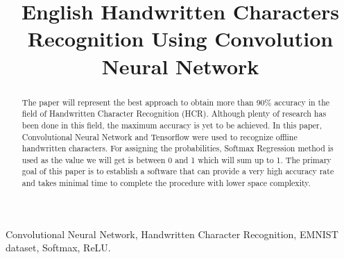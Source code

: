 \documentclass[conference]{IEEEtran}
\begin{document}
\title{English Handwritten Characters Recognition Using Convolution Neural Network}

\author{
\and
{}
\and
{}

}

\maketitle

\begin{abstract}
The  paper will represent the best approach to obtain more than 90\% accuracy in the field of Handwritten Character Recognition (HCR). Although plenty of research has been done in this field, the maximum accuracy is yet to be achieved. In this paper, Convolutional Neural Network  and Tensorflow were used to recognize offline handwritten characters. For assigning the probabilities, Softmax Regression method is used as the value we will get is between 0 and 1 which will sum up to 1. The primary goal of this paper is to establish a  software that can provide a very high accuracy rate and takes minimal time to complete the procedure with lower space complexity.

\end{abstract}

\begin{IEEEkeywords}
Convolutional Neural Network, Handwritten Character Recognition, EMNIST dataset, Softmax, ReLU.
\end{IEEEkeywords}
\end{document}
